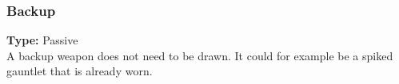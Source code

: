 \subsubsection{Backup}
\label{iqty:backup}
\textbf{Type:} Passive\\
A backup weapon does not need to be drawn. It could for example be a spiked gauntlet that is
already worn.

